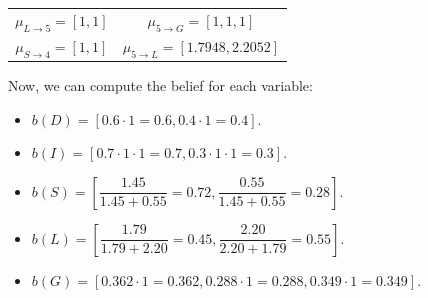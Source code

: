 \begin{example}
\begin{table}[H]
\begin{tabular}{|cc|}
        $\mu_{L \rightarrow 5}=[1,1]$ & $\mu_{5 \rightarrow G}=[1,1,1]$ \\
        $\mu_{S \rightarrow 4}=[1,1]$ & $\mu_{5 \rightarrow L}=[1.7948,2.2052]$   \\ \hline
        \end{tabular}
    \end{table}
    Now, we can compute the belief for each variable:
    \begin{itemize}
        \item $b(D) = \left[0.6 \cdot 1 = 0.6, 0.4 \cdot 1 = 0.4\right]$.
        \item $b(I) = \left[0.7 \cdot 1 \cdot 1 = 0.7, 0.3 \cdot 1 \cdot 1 = 0.3\right]$.
        \item $b(S) = \left[\dfrac{1.45}{1.45 + 0.55}= 0.72, \dfrac{0.55}{ 1.45 + 0.55} = 0.28\right]$.
        \item $b(L)=\left[\dfrac{1.79}{1.79 + 2.20}= 0.45, \dfrac{2.20}{2.20+1.79} = 0.55\right]$.
        \item $b(G) = \left[0.362 \cdot 1 = 0.362, 0.288 \cdot 1 = 0.288, 0.349 \cdot 1 = 0.349\right]$.
    \end{itemize}
\end{example}

